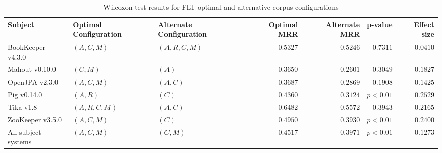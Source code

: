 \begin{landscape}

\begin{table}
\begin{spacing}{1.2}
\centering
\caption{Wilcoxon test results for FLT optimal and alternative corpus configurations}
\label{table:combo-flt-corpus-sweep-wilcox}
\begin{tabular}{lllrrrr}
\toprule
                      Subject & Optimal Configuration & Alternate Configuration & Optimal MRR & Alternate MRR &  p-value & Effect size \\
\midrule
            BookKeeper v4.3.0 &           $(A, C, M)$ &          $(A, R, C, M)$ &    $0.5327$ &      $0.5246$ & $0.7311$ &    $0.0410$ \\
               Mahout v0.10.0 &              $(C, M)$ &                   $(A)$ &    $0.3650$ &      $0.2601$ & $0.3049$ &    $0.1827$ \\
               OpenJPA v2.3.0 &           $(A, C, M)$ &                $(A, C)$ &    $0.3687$ &      $0.2869$ & $0.1908$ &    $0.1425$ \\
                  Pig v0.14.0 &              $(A, R)$ &                   $(C)$ &    $0.4360$ &      $0.3124$ & $p<0.01$ &    $0.2529$ \\
                    Tika v1.8 &        $(A, R, C, M)$ &                $(A, C)$ &    $0.6482$ &      $0.5572$ & $0.3943$ &    $0.2165$ \\
             ZooKeeper v3.5.0 &           $(A, C, M)$ &                   $(C)$ &    $0.4950$ &      $0.3930$ & $p<0.01$ &    $0.2400$ \\
 \midrule
All subject systems &           $(A, C, M)$ &                $(C, M)$ &    $0.4517$ &      $0.3971$ & $p<0.01$ &    $0.1273$ \\
\bottomrule
\end{tabular}

\end{spacing}
\end{table}



\end{landscape}

